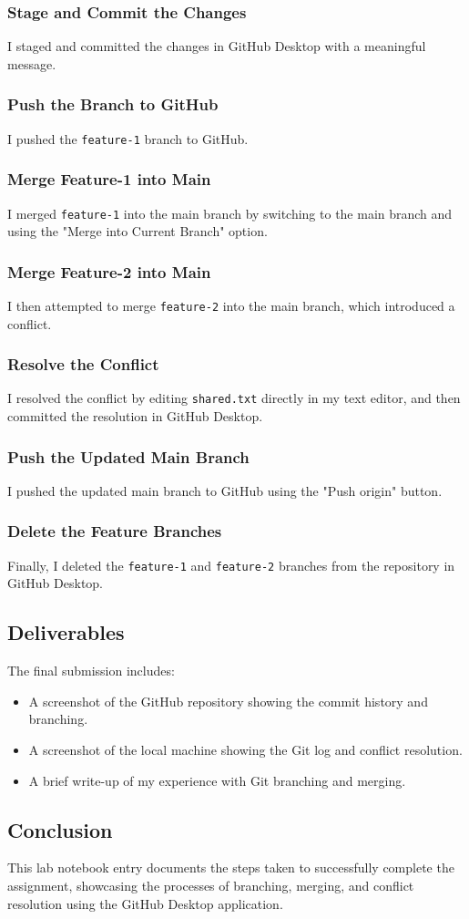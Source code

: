 \subsubsection{Stage and Commit the Changes}
I staged and committed the changes in GitHub Desktop with a meaningful message.

\subsubsection{Push the Branch to GitHub}
I pushed the \texttt{feature-1} branch to GitHub.

\subsubsection{Merge Feature-1 into Main}
I merged \texttt{feature-1} into the main branch by switching to the main branch and using the "Merge into Current Branch" option.

\subsubsection{Merge Feature-2 into Main}
I then attempted to merge \texttt{feature-2} into the main branch, which introduced a conflict.

\subsubsection{Resolve the Conflict}
I resolved the conflict by editing \texttt{shared.txt} directly in my text editor, and then committed the resolution in GitHub Desktop.

\subsubsection{Push the Updated Main Branch}
I pushed the updated main branch to GitHub using the "Push origin" button.

\subsubsection{Delete the Feature Branches}
Finally, I deleted the \texttt{feature-1} and \texttt{feature-2} branches from the repository in GitHub Desktop.

\subsection{Deliverables}
The final submission includes:
\begin{itemize}
    \item A screenshot of the GitHub repository showing the commit history and branching.
    \item A screenshot of the local machine showing the Git log and conflict resolution.
    \item A brief write-up of my experience with Git branching and merging.
\end{itemize}

\subsection{Conclusion}
This lab notebook entry documents the steps taken to successfully complete the assignment, showcasing the processes of branching, merging, and conflict resolution using the GitHub Desktop application.
